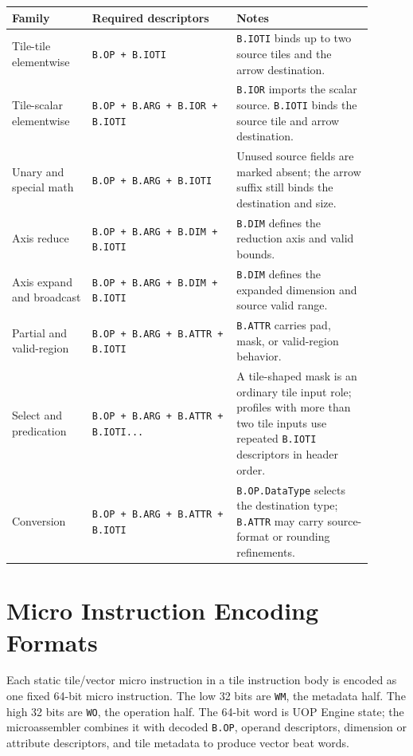 {\scriptsize
\begin{longtable}{@{}L{0.20\linewidth}L{0.36\linewidth}L{0.34\linewidth}@{}}
\toprule
Family & Required descriptors & Notes \\
\midrule
Tile-tile elementwise & \texttt{B.OP + B.IOTI} & \texttt{B.IOTI} binds up to two source tiles and the arrow destination. \\
Tile-scalar elementwise & \texttt{B.OP + B.ARG + B.IOR + B.IOTI} & \texttt{B.IOR} imports the scalar source. \texttt{B.IOTI} binds the source tile and arrow destination. \\
Unary and special math & \texttt{B.OP + B.ARG + B.IOTI} & Unused source fields are marked absent; the arrow suffix still binds the destination and size. \\
Axis reduce & \texttt{B.OP + B.ARG + B.DIM + B.IOTI} & \texttt{B.DIM} defines the reduction axis and valid bounds. \\
Axis expand and broadcast & \texttt{B.OP + B.ARG + B.DIM + B.IOTI} & \texttt{B.DIM} defines the expanded dimension and source valid range. \\
Partial and valid-region & \texttt{B.OP + B.ARG + B.ATTR + B.IOTI} & \texttt{B.ATTR} carries pad, mask, or valid-region behavior. \\
Select and predication & \texttt{B.OP + B.ARG + B.ATTR + B.IOTI...} & A tile-shaped mask is an ordinary tile input role; profiles with more than two tile inputs use repeated \texttt{B.IOTI} descriptors in header order. \\
Conversion & \texttt{B.OP + B.ARG + B.ATTR + B.IOTI} & \texttt{B.OP.DataType} selects the destination type; \texttt{B.ATTR} may carry source-format or rounding refinements. \\
\bottomrule
\end{longtable}
}

\section{Micro Instruction Encoding Formats}
\label{sec:micro_instruction_encoding}
Each static tile/vector micro instruction in a tile instruction body is encoded as one fixed 64-bit micro instruction. The low 32 bits are \texttt{WM}, the metadata half. The high 32 bits are \texttt{WO}, the operation half. The 64-bit word is UOP Engine state; the microassembler combines it with decoded \texttt{B.OP}, operand descriptors, dimension or attribute descriptors, and tile metadata to produce vector beat words.

